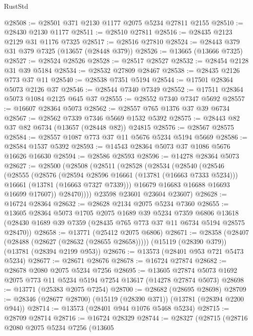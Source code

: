 \begin{lexlean}{RustStd}
\begin{coremodule}
@28508 := @28501 @371 @2130 @1177 @2075 @5234 @27811 @2155
@28510 := @28430 @2130 @1177
@28511 := @28510 @27811
@28516 := @28435 @2123 @2129 @31 @1176 @7325
@28517 := @28516 @27810
@28524 := @28443 @379 @31 @379 @7325 (@13657 (@28448 @379))
@28526 := @13665 (@13666 @7325)
@28527 := @28524 @28526
@28528 := @28517 @28527
@28532 := @28454 @2128 @31 @39 @5184
@28534 := @28532 @27809 @28467
@28538 := @28435 @2126 @773 @37 @11
@28540 := @28538 @7351 @5194
@28544 := @17501 @28364 @5073 @2126 @37
@28546 := @28544 @7340 @7349
@28552 := @17511 @28364 @5073 @1084 @2125 @645 @37
@28555 := @28552 @7340 @7347 @5692
@28557 := @16607 @28364 @5073
@28562 := @28557 @765 @1376 @37 @39 @6734
@28567 := @28562 @7339 @7346 @5669 @1532 @5392
@28575 := @28443 @82 @37 @82 @6734 (@13657 (@28448 @82)) @24815
@28576 := @28567 @28575
@28584 := @28557 @1087 @773 @37 @11 @5676 @5234 @5194 @5669
@28586 := @28584 @1537 @5392
@28593 := @14543 @28364 @5073 @37 @1086 @5676 @16626 @16630
@28594 := @28586 @28593
@28596 := @14278 @28364 @5073
@28627 := @28500
    (@28508
      (@28511
        (@28528
          (@28534
            (@28540
              (@28546
                (@28555
                  (@28576
                    (@28594 @28596 @16661 (@13781 (@16663 @7333 @5234)))
                    @16661
                    (@13781 (@16663 @7327 @7339)))
                  @16679
                  @16683
                  @16688
                  @16693
                  @16699
                  @17607))
              @28470))))
      @23598
      @23601
      @23604
      @23607)
@28628 := @16724 @28364
@28632 := @28628 @2134 @2075 @5234 @7360
@28655 := @13605
    @28364
    @5073
    @1705
    @2075
    @1689
    @39
    @5234
    @7359
    @6806
    @13618
    (@28430 @1689 @39 @7359 (@28435 @765 @773 @37 @11 @6734 @5194 @28575 @28470))
@28658 := @13771 (@25412 @2075 @6806)
@28671 := @28358
    (@28407 (@28488 (@28627 (@28632 (@28655 @28658)))))
    (@15119 (@28390 @379))
    (@13781 (@28394 @2199 @953))
@28676 := @13573 (@28401 @953 @721 @5473 @5234)
@28677 := @28671 @28676
@28678 := @16724 @27874
@28682 := @28678 @2080 @2075 @5234 @7256
@28695 := @13605 @27874 @5073 @1692 @2075 @773 @11 @5234 @5194 @7254 @13617 (@14278 @27874 @5073)
@28698 := @13771 (@25383 @2075 @7254)
@28700 := @28682 (@28695 @28698)
@28709 := @28346 (@28677 @28700) (@15119 (@28390 @371)) (@13781 (@28394 @2200 @944))
@28714 := @13573 (@28401 @944 @1076 @5468 @5234)
@28715 := @28709 @28714
@28716 := @16724 @28329
@28744 := @28327
    (@28715
      (@28716
        @2080
        @2075
        @5234
        @7256
        (@13605

\end{coremodule}
\end{lexlean}
